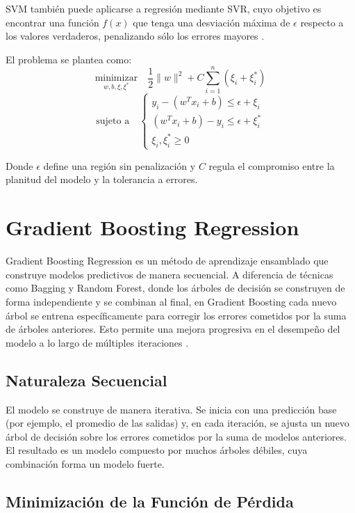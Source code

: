 	SVM también puede aplicarse a regresión mediante SVR, cuyo objetivo es encontrar una función $f(x)$ que tenga una desviación máxima de $\epsilon$ respecto a los valores verdaderos, penalizando sólo los errores mayores \citep{james2013, veirana2021}.
	
	El problema se plantea como:
	\[
	\underset{w, b, \xi, \xi^*}{\text{minimizar}} \quad \frac{1}{2} \|w\|^2 + C \sum_{i=1}^{n} (\xi_i + \xi_i^*)
	\]
	\[
	\text{sujeto a} \quad 
	\begin{cases}
		y_i - (w^T x_i + b) \leq \epsilon + \xi_i \\
		(w^T x_i + b) - y_i \leq \epsilon + \xi_i^* \\
		\xi_i, \xi_i^* \geq 0
	\end{cases}
	\]
	
	Donde $\epsilon$ define una región sin penalización y $C$ regula el compromiso entre la planitud del modelo y la tolerancia a errores.

	
	
\section{Gradient Boosting Regression}

Gradient Boosting Regression es un método de aprendizaje ensamblado que construye modelos predictivos de manera secuencial. A diferencia de técnicas como Bagging y Random Forest, donde los árboles de decisión se construyen de forma independiente y se combinan al final, en Gradient Boosting cada nuevo árbol se entrena específicamente para corregir los errores cometidos por la suma de árboles anteriores. Esto permite una mejora progresiva en el desempeño del modelo a lo largo de múltiples iteraciones \citep{james2013, hastie2009, friedman2001}.

\subsection{Naturaleza Secuencial}

El modelo se construye de manera iterativa. Se inicia con una predicción base (por ejemplo, el promedio de las salidas) y, en cada iteración, se ajusta un nuevo árbol de decisión sobre los errores cometidos por la suma de modelos anteriores. El resultado es un modelo compuesto por muchos árboles débiles, cuya combinación forma un modelo fuerte.

\subsection{Minimización de la Función de Pérdida}


